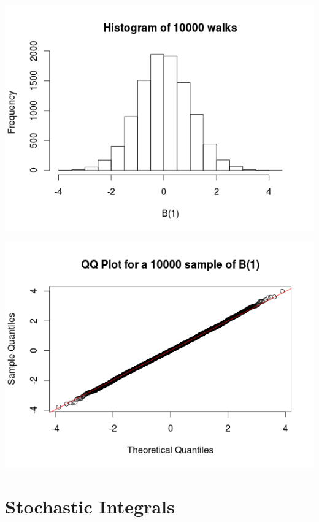 \begin{frame}
\begin{center}
\includegraphics[scale=0.5]{hist.png}
\end{center}
\end{frame}

\begin{frame}
\begin{center}
\includegraphics[scale=0.5]{qqplot.png}
\end{center}
\end{frame}


\section{Stochastic Integrals}

